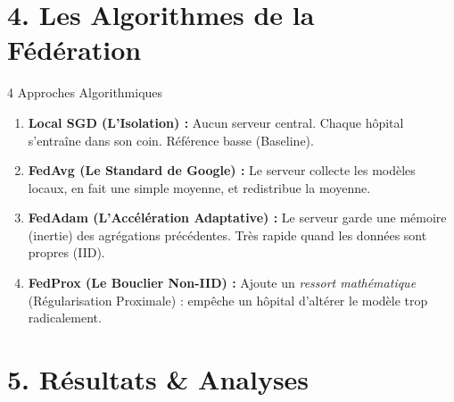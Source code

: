 \documentclass[aspectratio=169,11pt]{beamer}
\begin{document}
\section{4. Les Algorithmes de la F\'{e}d\'{e}ration}

\begin{frame}{4 Approches Algorithmiques}
  \begin{enumerate}
    \item \textbf{Local SGD (L'Isolation) :}
          Aucun serveur central. Chaque h\^{o}pital s'entra\^{i}ne dans son coin. R\'{e}f\'{e}rence basse (Baseline).
    \vspace{0.2cm}
    \item \textbf{FedAvg (Le Standard de Google) :}
          Le serveur collecte les mod\`{e}les locaux, en fait une simple moyenne, et redistribue la moyenne.
    \vspace{0.2cm}
    \item \textbf{FedAdam (L'Acc\'{e}l\'{e}ration Adaptative) :}
          Le serveur garde une m\'{e}moire (inertie) des agr\'{e}gations pr\'{e}c\'{e}dentes. Tr\`{e}s rapide quand les donn\'{e}es sont propres (IID).
    \vspace{0.2cm}
    \item \textbf{FedProx (Le Bouclier Non-IID) :}
          Ajoute un \emph{ressort math\'{e}matique} (R\'{e}gularisation Proximale) : emp\^{e}che un h\^{o}pital d'alt\'{e}rer le mod\`{e}le trop radicalement.
  \end{enumerate}
\end{frame}

\section{5. R\'{e}sultats \& Analyses}
\end{document}
